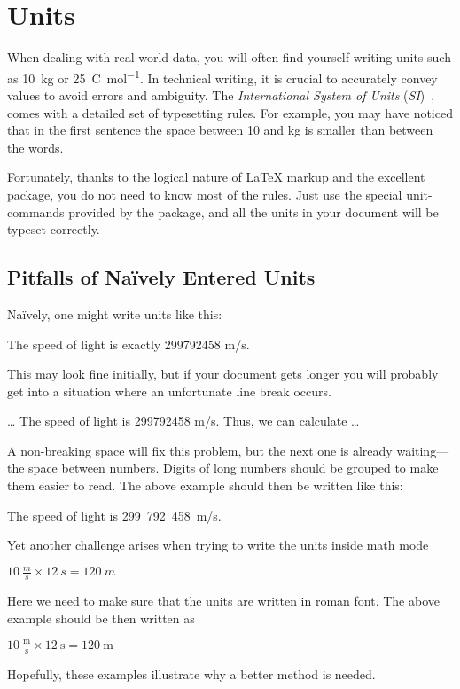 \section{Units}\label{sec:units}

When dealing with real world data, you will often find yourself writing units
such as \qty{10}{\kg} or \qty{25}{\coulomb\per\mole}. In technical writing, it
is crucial to accurately convey values to avoid errors and ambiguity. The
\emph{International System of Units} (\emph{SI})~\cite{si}, comes with a
detailed set of typesetting rules. For example, you may have noticed that in
the first sentence the space between \num{10} and \unit{\kg} is smaller than
between the words.

Fortunately, thanks to the logical nature of \LaTeX{} markup and the excellent
 package, you do not need to know most of the rules. Just use the
special unit-commands provided by the package, and all the units in your
document will be typeset correctly.

\subsection{Pitfalls of Naïvely Entered Units}

Naïvely, one might write units like this:
\begin{example}
The speed of light
is exactly 299792458 m/s.
\end{example}
This may look fine initially, but if your document gets longer you will probably
get into a situation where an unfortunate line break occurs.
\begin{example}
\ldots{} The speed of light
is 299792458 m/s. Thus, we
can calculate \ldots
\end{example}
A non-breaking space will fix this problem, but the next one is already
waiting---the space between numbers. Digits of long numbers should be grouped
to make them easier to read. The above example should then be written like this:
\begin{example}
The speed of light is
299~792~458~m/s.
\end{example}
Yet another challenge arises when trying to write the units inside math
mode
\begin{example}
\(10~\frac{m}{s}
  \times 12~s = 120~m\)
\end{example}
Here we need to make sure that the units are written in roman font.
The above example should be then written as
\begin{example}
\(10~\frac{\textrm{m}}
  {\textrm{s}}
  \times 12~\textrm{s}
  = 120~\textrm{m}\)
\end{example}
Hopefully, these examples illustrate why a better method is needed.

